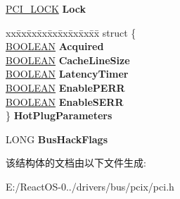 \begin{DoxyCompactItemize}
\hyperlink{struct___p_c_i___l_o_c_k}{P\+C\+I\+\_\+\+L\+O\+CK} {\bfseries Lock}
\item 
\mbox{\label{struct___p_c_i___f_d_o___e_x_t_e_n_s_i_o_n_a9dabfdc1a07b3a0a9ca8d76d1c91acba}} 
\begin{tabbing}
xx\=xx\=xx\=xx\=xx\=xx\=xx\=xx\=xx\=\kill
struct \{\\
\>\hyperlink{_processor_bind_8h_a112e3146cb38b6ee95e64d85842e380a}{BOOLEAN} {\bfseries Acquired}\\
\>\hyperlink{_processor_bind_8h_a112e3146cb38b6ee95e64d85842e380a}{BOOLEAN} {\bfseries CacheLineSize}\\
\>\hyperlink{_processor_bind_8h_a112e3146cb38b6ee95e64d85842e380a}{BOOLEAN} {\bfseries LatencyTimer}\\
\>\hyperlink{_processor_bind_8h_a112e3146cb38b6ee95e64d85842e380a}{BOOLEAN} {\bfseries EnablePERR}\\
\>\hyperlink{_processor_bind_8h_a112e3146cb38b6ee95e64d85842e380a}{BOOLEAN} {\bfseries EnableSERR}\\
\} {\bfseries HotPlugParameters}\\

\end{tabbing}\item 
\mbox{\label{struct___p_c_i___f_d_o___e_x_t_e_n_s_i_o_n_a6471eb0b7560e8ec4a9dd8600a3acd59}} 
L\+O\+NG {\bfseries Bus\+Hack\+Flags}
\end{DoxyCompactItemize}


该结构体的文档由以下文件生成\+:\begin{DoxyCompactItemize}
\item 
E\+:/\+React\+O\+S-\/0../drivers/bus/pcix/pci.\+h\end{DoxyCompactItemize}
